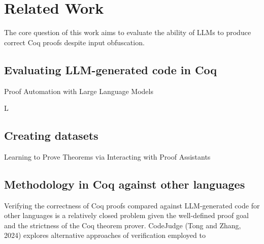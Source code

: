 
\section{Related Work}
\label{sec:related-work}

The core question of this work aims to evaluate
the ability of LLMs to produce correct Coq proofs
despite input obfuscation.

\subsection
{Evaluating LLM-generated code in Coq}
Proof Automation with Large Language Models

L

\subsection
{Creating datasets}
Learning to Prove Theorems via
Interacting with Proof Assistants


\subsection
{Methodology in Coq against other languages}

Verifying the correctness of Coq proofs
compared against LLM-generated code for other
languages is a relatively closed problem
given the well-defined proof goal and the
strictness of the Coq theorem prover.
CodeJudge (Tong and Zhang, 2024) explores
alternative approaches of verification
employed to 

